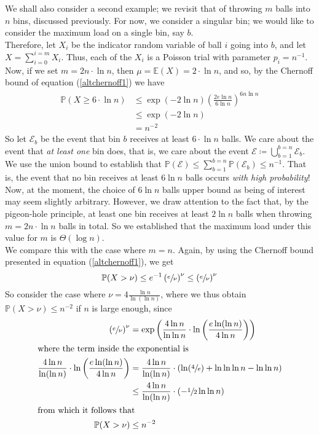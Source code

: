 	We shall also consider a second example; we revisit that of throwing $m$ balls into $n$ 
	bins, discussed previously. For now, we consider a singular bin; we would like to consider 
	the maximum load on a single bin, say $b$.\\
	Therefore, let $X_i$ be the indicator random variable of ball $i$ going into $b$, and let $
	X = \sum_{i=0}^{i=m} X_i$. Thus, each of the $X_i$ is a Poisson trial with parameter $p_i 
	= n^{-1}$. Now, if we set $m = 2n \cdot \ln n$, then $\mu = \mathbb{E}(X) = 2 \cdot \ln n$, 
	and so, by the Chernoff bound of equation (\ref{altchernoff1}) we have 
	\begin{align*}
		\mathbb{P}(X \geq 6\cdot\ln n) &\leq 
		\exp(-2\ln n)\left(\frac{2e \ln n}{6 \ln n}\right)^{6n \dot\ln n} \\
		&\leq \exp(-2 \ln n) \\
		&= n^{-2}
	\end{align*}
	So let $\mathcal{E}_b$ be the event that bin $b$ receives at least $6 \cdot \ln n$ balls.
	We care about the event that \emph{at least one} bin does, that is, we care about the 
	event $\mathcal{E} \coloneqq \bigcup_{b=1}^{b=n} \mathcal{E}_b$. \\
	We use the union bound to establish that $\mathbb{P}(\mathcal{E}) \leq \sum_{b = 1}^{b=n} 
	\mathbb{P}(\mathcal{E}_b) \leq n^{-1}$. That is, the event that no bin receives at least 
	$6 \ln n$ balls occurs \emph{with high probability}! Now, at the moment, the choice of $6 
	\ln n$ balls upper bound as being of interest may seem slightly arbitrary. However, we 
	draw attention to the fact that, by the pigeon-hole principle, at least one bin receives at 
	least $2 \ln n$ balls when throwing $m = 2n\cdot \ln n$ balls in total. So we established 
	that the maximum load under this value for $m$ is $\Theta(\log n)$. \\
	We compare this with the case where $m=n$. Again, by using the Chernoff bound presented in 
	equation (\ref{altchernoff1}), we get
	$$
		\mathbb{P}(X>\nu) \leq e^{-1} \left(\sfrac{e}{\nu}\right)^\nu \leq 
		\left(\sfrac{e}{\nu}\right)^\nu
	$$
	So consider the case where $\nu = 4 \frac{\ln n}{\ln(\ln n)}$, where we thus obtain 
	$\mathbb{P}(X > \nu) \leq n^{-2}$ if $n$ is large enough, since 
	\begin{align}
	\nonumber
		\left(\sfrac{e}{\nu}\right)^\nu &= \exp\left(\frac{4\ln n}{\ln\ln n} \cdot 
		\ln\left(\frac{e\ln(\ln n)}{4 \ln n}\right)\right) \\
		\intertext{where the term inside the exponential is}
		\nonumber
		\frac{4\ln n}{\ln(\ln n)} \cdot \ln\left(\frac{e\ln(\ln n)}{4 \ln n}\right) &=
		\frac{4\ln n}{\ln(\ln n)} \cdot (\ln(\sfrac{4}{e}) + \ln\ln\ln n - \ln\ln n) \\
		\label{stepwithlargen}
		&\leq \frac{4\ln n}{\ln(\ln n)} \cdot (-\sfrac{1}{2} \ln\ln n) \\
		\intertext{from which it follows that}
		\mathbb{P}(X> \nu) &\leq n^{-2}
	\end{align}
